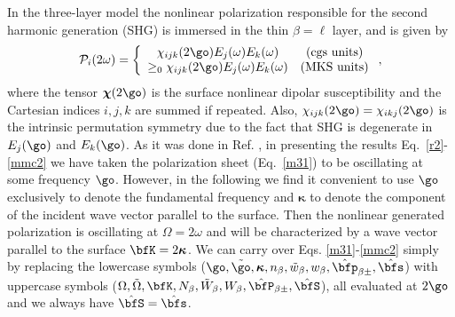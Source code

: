 In the three-layer model the nonlinear polarization responsible for 
the second harmonic generation (SHG) is immersed in the thin $\beta=\ell$
layer, and is given by 
\begin{equation}\label{tres}
\mathcal{P}_i(2\omega)=
\left\{
\begin{array}{cc}
\chi_{ijk}(2\go)E_{j}(\omega)E_{k}(\omega) & \text{(cgs units)} \\
\ge_0\chi_{ijk}(2\go)E_{j}(\omega)E_{k}(\omega) & \text{(MKS units)}
\end{array}
\right.
,
\end{equation}
where the  
tensor $\boldsymbol{\chi}(2\go)$ is the surface nonlinear  
dipolar susceptibility and the Cartesian indices $i,j,k$ are summed if repeated. 
Also, $\chi_{ijk}(2\go)=\chi_{ikj}(2\go)$ 
is the intrinsic permutation symmetry
due to the fact that SHG is degenerate in $E_j(\go)$ and $E_k(\go)$.
As it was done in Ref. \cite{mizrahiJOSA88},
in presenting the results Eq.~\eqref{r2}-\eqref{mmc2}
we have taken the
polarization sheet (Eq.~\eqref{m31}) to be oscillating at some frequency
$\go$. However,
 in the following we find it convenient to use $\go$
exclusively to denote the fundamental frequency and
$\boldsymbol{\kappa}$
 to denote the
component of the incident wave vector parallel to the surface. Then
the nonlinear 
generated polarization is oscillating at $\Omega= 2\omega$
and will be characterized
by a wave vector parallel to the surface 
$\bfK=2\boldsymbol{\kappa}$. 
We can carry over
Eqs. \eqref{m31}-\eqref{mmc2} 
simply by replacing the lowercase symbols 
($\go,\tilde\go,\boldsymbol{\kappa},n_\beta,\tilde w_\beta,w_\beta,\hat\bfp_{\beta\pm},\hat\bfs$)  
with uppercase symbols 
($\Omega,\tilde\Omega,\bfK,N_\beta,\tilde W_\beta,W_\beta,\hat\bfP_{\beta\pm},\hat\bfS$),
all evaluated at $2\go$ and
we always have $\hat\bfS=\hat\bfs$.

